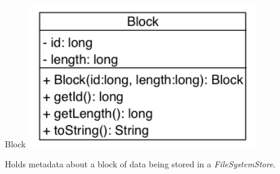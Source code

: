 \begin{XeClass}{Block}
\includegraphics[width=10cm]{cdig/Block.png}
     
 Holds metadata about a block of data being stored in a \emph{FileSystemStore}.

\end{XeClass}
